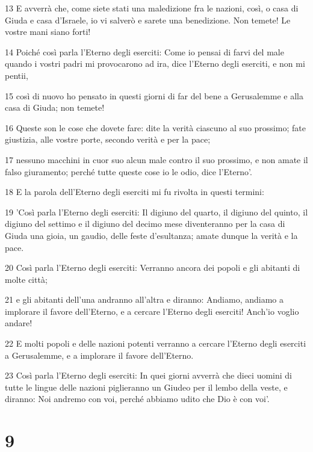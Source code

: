 \par 13 E avverrà che, come siete stati una maledizione fra le nazioni, così, o casa di Giuda e casa d'Israele, io vi salverò e sarete una benedizione. Non temete! Le vostre mani siano forti!
\par 14 Poiché così parla l'Eterno degli eserciti: Come io pensai di farvi del male quando i vostri padri mi provocarono ad ira, dice l'Eterno degli eserciti, e non mi pentii,
\par 15 così di nuovo ho pensato in questi giorni di far del bene a Gerusalemme e alla casa di Giuda; non temete!
\par 16 Queste son le cose che dovete fare: dite la verità ciascuno al suo prossimo; fate giustizia, alle vostre porte, secondo verità e per la pace;
\par 17 nessuno macchini in cuor suo alcun male contro il suo prossimo, e non amate il falso giuramento; perché tutte queste cose io le odio, dice l'Eterno'.
\par 18 E la parola dell'Eterno degli eserciti mi fu rivolta in questi termini:
\par 19 'Così parla l'Eterno degli eserciti: Il digiuno del quarto, il digiuno del quinto, il digiuno del settimo e il digiuno del decimo mese diventeranno per la casa di Giuda una gioia, un gaudio, delle feste d'esultanza; amate dunque la verità e la pace.
\par 20 Così parla l'Eterno degli eserciti: Verranno ancora dei popoli e gli abitanti di molte città;
\par 21 e gli abitanti dell'una andranno all'altra e diranno: Andiamo, andiamo a implorare il favore dell'Eterno, e a cercare l'Eterno degli eserciti! Anch'io voglio andare!
\par 22 E molti popoli e delle nazioni potenti verranno a cercare l'Eterno degli eserciti a Gerusalemme, e a implorare il favore dell'Eterno.
\par 23 Così parla l'Eterno degli eserciti: In quei giorni avverrà che dieci uomini di tutte le lingue delle nazioni piglieranno un Giudeo per il lembo della veste, e diranno: Noi andremo con voi, perché abbiamo udito che Dio è con voi'.

\chapter{9}

